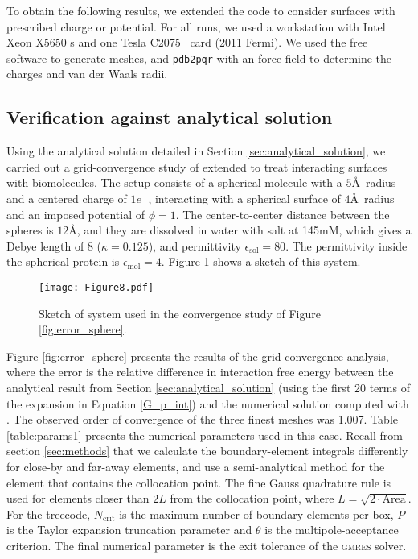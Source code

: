 
To obtain the following results, we extended the \pygbe code to consider surfaces with prescribed charge or potential. For all runs, we used a workstation with Intel Xeon X5650 \cpu s  and one \nvidia Tesla C2075 \gpu\ card (2011 Fermi). We used the free \msms software \cite{SannerOlsonSpehner1995} to generate meshes, and \texttt{pdb2pqr} \cite{Dolinsky04} with an \amber force field to determine the charges and van der Waals radii. 

\subsection{Verification against analytical solution} \label{sec:verification}

Using the analytical solution detailed in Section \ref{sec:analytical_solution}, we carried out a grid-convergence study of \pygbe extended to treat interacting surfaces with biomolecules. The setup consists of a spherical molecule with a $5$\AA~radius and a centered charge of $1e^-$, interacting with a spherical surface of $4$\AA~radius and an imposed potential of $\phi=1$. The center-to-center distance between the spheres is $12$\AA, and they are dissolved in water with salt at 145mM, which gives a Debye length of 8 ($\kappa = 0.125$), and permittivity $\epsilon_\text{sol} = 80$. The permittivity inside the spherical protein is $\epsilon_\text{mol} = 4$. Figure \ref{fig:twosphere_num} shows a sketch of this system.

\begin{figure}[h] %
   \centering
   \texttt{[image: Figure8.pdf]} 
   \caption{Sketch of system used in the convergence study of Figure \ref{fig:error_sphere}.}
   \label{fig:twosphere_num}
\end{figure}

Figure \ref{fig:error_sphere} presents the results of the grid-convergence analysis, where the error is the relative difference in interaction free energy between the analytical result from Section \ref{sec:analytical_solution} (using the first 20 terms of the expansion in Equation \eqref{G_p_int}) and the numerical solution computed with \pygbe. The observed order of convergence of the three finest meshes was 1.007. Table \ref{table:params1} presents the numerical parameters used in this case. Recall from section \ref{sec:methods} that we calculate the boundary-element integrals differently for close-by and far-away elements, and use a semi-analytical method for the element that contains the collocation point. The fine Gauss quadrature rule is used for elements closer than $2L$ from the collocation point, where $L=\sqrt{2\cdot \text{Area}}$. For the treecode,  $N_{\text{crit}}$ is the maximum number of boundary elements per box, $P$ is the Taylor expansion truncation parameter and $\theta$ is the multipole-acceptance criterion. The final numerical parameter is the exit tolerance of the \textsc{gmres} solver.

